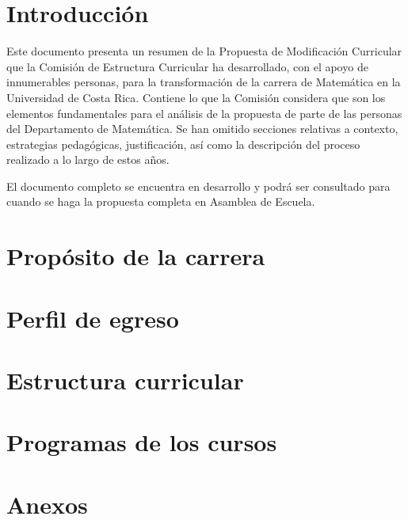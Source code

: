 \documentclass[11pt]{report}
\begin{document}

\tableofcontents


\clearpage

\chapter*{Introducción}
Este documento presenta un resumen de la Propuesta de Modificación Curricular que la Comisión de Estructura Curricular ha desarrollado, con el apoyo de innumerables personas, para la transformación de la carrera de Matemática en la Universidad de Costa Rica. Contiene lo que la Comisión considera que son los elementos fundamentales para el análisis de la propuesta de parte de las personas del Departamento de Matemática. Se han omitido secciones relativas a contexto, estrategias pedagógicas, justificación, así como la descripción del proceso realizado a lo largo de estos años.

El documento completo se encuentra en desarrollo y podrá ser consultado para cuando se haga la propuesta completa en Asamblea de Escuela.

\chapter{Propósito de la carrera}


\chapter{Perfil de egreso}


\chapter{Estructura curricular}


\chapter{Programas de los cursos}


\chapter{Anexos}



\printbibliography[]
\end{document}
